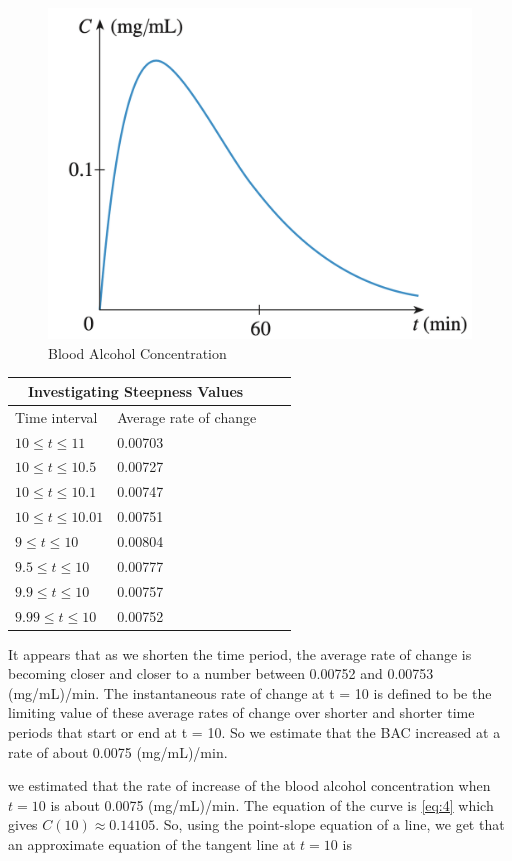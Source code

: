\begin{figure}[h]
    \centering
    \includegraphics[scale=0.3]{chapter001/figures/fig005}
    \caption{Blood Alcohol Concentration}
    \label{fig:Fig5}
\end{figure}

\begin{center}
	\begin{tabular}{ |p{3cm}||p{3cm}|p{3cm}|p{3cm}|}
 		\hline
 		\multicolumn{2}{|c|}{Investigating Steepness Values} \\
		\hline
 		Time interval & Average rate of change\\
		\hline
 		$10 \leq t \leq 11$    & 0.00703\\
 		$10 \leq t \leq 10.5$  & 0.00727\\
 		$10 \leq t \leq 10.1$  & 0.00747\\
 		$10 \leq t \leq 10.01$ & 0.00751 \\
 		$9 \leq t \leq 10$     & 0.00804\\
 		$9.5 \leq t \leq 10$   & 0.00777\\
 		$9.9 \leq t \leq 10$   & 0.00757\\
 		$9.99 \leq t \leq 10$  & 0.00752\\
 		\hline
	\end{tabular}
\end{center}


\begin{flushleft}
It appears that as we shorten the time period, the average rate of change is becoming closer and closer to a number between 0.00752 and 0.00753 (mg/mL)/min. The instantaneous rate of change at t = 10 is defined to be the limiting value of these average rates of change over shorter and shorter time periods that start or end at t = 10. So we estimate that the BAC increased at a rate of about 0.0075 (mg/mL)/min.

we estimated that the rate of increase of the blood alcohol concentration when $t = 10$ is about 0.0075 (mg/mL)/min. The equation of the curve is \ref{eq:4} which gives $C(10) \approx 0.14105$. So, using the point-slope equation of a line, we get that an approximate equation of the tangent line at $t=10$ is 
\end{flushleft}

